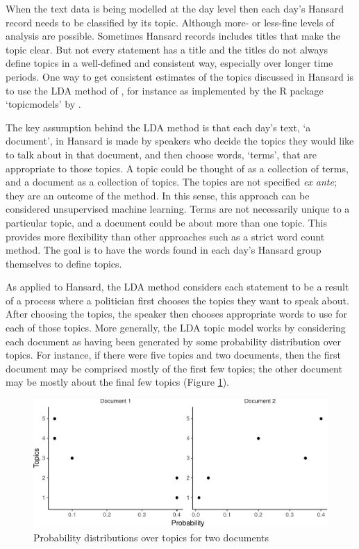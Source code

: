 \documentclass[12pt,]{article}
\theoremstyle{definition}
\theoremstyle{definition}
\theoremstyle{definition}
\theoremstyle{remark}
\begin{document}
When the text data is being modelled at the day level then each day's
Hansard record needs to be classified by its topic. Although more- or
less-fine levels of analysis are possible. Sometimes Hansard records
includes titles that make the topic clear. But not every statement has a
title and the titles do not always define topics in a well-defined and
consistent way, especially over longer time periods. One way to get
consistent estimates of the topics discussed in Hansard is to use the
LDA method of \citet{Blei2003latent}, for instance as implemented by the
R package `topicmodels' by \citet{Grun2011}.

The key assumption behind the LDA method is that each day's text, `a
document', in Hansard is made by speakers who decide the topics they
would like to talk about in that document, and then choose words,
`terms', that are appropriate to those topics. A topic could be thought
of as a collection of terms, and a document as a collection of topics.
The topics are not specified \emph{ex ante}; they are an outcome of the
method. In this sense, this approach can be considered unsupervised
machine learning. Terms are not necessarily unique to a particular
topic, and a document could be about more than one topic. This provides
more flexibility than other approaches such as a strict word count
method. The goal is to have the words found in each day's Hansard group
themselves to define topics.

As applied to Hansard, the LDA method considers each statement to be a
result of a process where a politician first chooses the topics they
want to speak about. After choosing the topics, the speaker then chooses
appropriate words to use for each of those topics. More generally, the
LDA topic model works by considering each document as having been
generated by some probability distribution over topics. For instance, if
there were five topics and two documents, then the first document may be
comprised mostly of the first few topics; the other document may be
mostly about the final few topics (Figure
\ref{fig:topicsoverdocuments}).

\begin{figure}
\centering
\includegraphics{svm-rmarkdown-article-example_files/figure-latex/topicsoverdocuments-1.pdf}
\caption{\label{fig:topicsoverdocuments}Probability distributions over
topics for two documents}
\end{figure}
\end{document}
